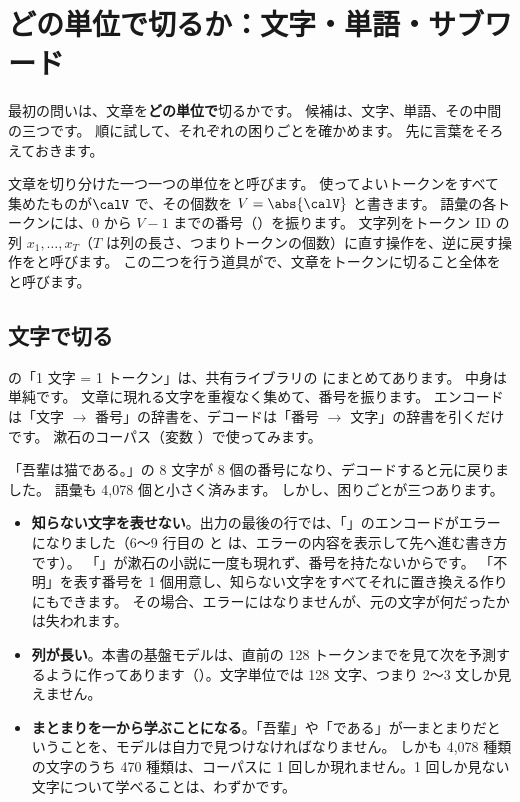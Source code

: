 \section{どの単位で切るか：文字・単語・サブワード}\label{sec:tok-units}

最初の問いは、文章を\textbf{どの単位で}切るかです。
候補は、文字、単語、その中間の三つです。
順に試して、それぞれの困りごとを確かめます。
先に言葉をそろえておきます。

\begin{definition}[トークン化]\label{def:tok-tokenization}
文章を切り分けた一つ一つの単位をと呼びます。
使ってよいトークンをすべて集めたものが$\calV$ で、その個数を $V=\abs{\calV}$ と書きます。
語彙の各トークンには、$0$ から $V-1$ までの番号（）を振ります。
文字列をトークン ID の列 $x_1,\dots,x_T$（$T$ は列の長さ、つまりトークンの個数）に直す操作を、逆に戻す操作をと呼びます。
この二つを行う道具がで、文章をトークンに切ること全体をと呼びます。
\end{definition}

\subsection*{文字で切る}

の「1 文字 = 1 トークン」は、共有ライブラリの  にまとめてあります。
中身は単純です。
文章に現れる文字を重複なく集めて、番号を振ります。
エンコードは「文字 $\to$ 番号」の辞書を、デコードは「番号 $\to$ 文字」の辞書を引くだけです。
漱石のコーパス（変数 ）で使ってみます。


「吾輩は猫である。」の 8 文字が 8 個の番号になり、デコードすると元に戻りました。
語彙も 4,078 個と小さく済みます。
しかし、困りごとが三つあります。

\begin{itemize}
\item \textbf{知らない文字を表せない}。出力の最後の行では、「」のエンコードがエラーになりました（6〜9 行目の  と  は、エラーの内容を表示して先へ進む書き方です）。
「\code{+}」が漱石の小説に一度も現れず、番号を持たないからです。
「不明」を表す番号を 1 個用意し、知らない文字をすべてそれに置き換える作りにもできます。
その場合、エラーにはなりませんが、元の文字が何だったかは失われます。
\item \textbf{列が長い}。本書の基盤モデルは、直前の 128 トークンまでを見て次を予測するように作ってあります（）。文字単位では 128 文字、つまり 2〜3 文しか見えません。
\item \textbf{まとまりを一から学ぶことになる}。「吾輩」や「である」が一まとまりだということを、モデルは自力で見つけなければなりません。
しかも 4,078 種類の文字のうち 470 種類は、コーパスに 1 回しか現れません。1 回しか見ない文字について学べることは、わずかです。
\end{itemize}


